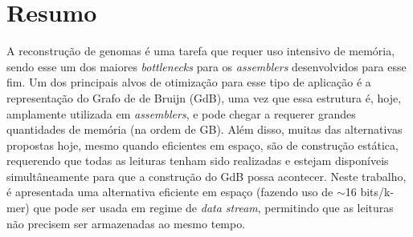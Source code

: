 \section{Resumo}

A reconstrução de genomas é uma tarefa que requer uso intensivo de memória,
sendo esse um dos maiores \emph{bottlenecks} para os \emph{assemblers} desenvolvidos para esse fim.
Um dos principais alvos de otimização para esse tipo de aplicação é a representação do Grafo de de Bruijn (GdB),
uma vez que essa estrutura é, hoje, amplamente utilizada em \emph{assemblers}, \color{red}e pode chegar a requerer grandes
quantidades de memória (na ordem de GB)\color{black}. Além disso, muitas das alternativas propostas hoje,
mesmo quando eficientes em espaço, são de construção estática, requerendo que todas as leituras tenham sido realizadas e
estejam disponíveis simultâneamente para que a construção do GdB possa acontecer. Neste trabalho, é apresentada uma alternativa
eficiente em espaço (fazendo uso de $\sim$16 bits/k-mer) que pode ser usada em regime de \emph{data stream},
permitindo que as leituras não precisem ser armazenadas ao mesmo tempo.